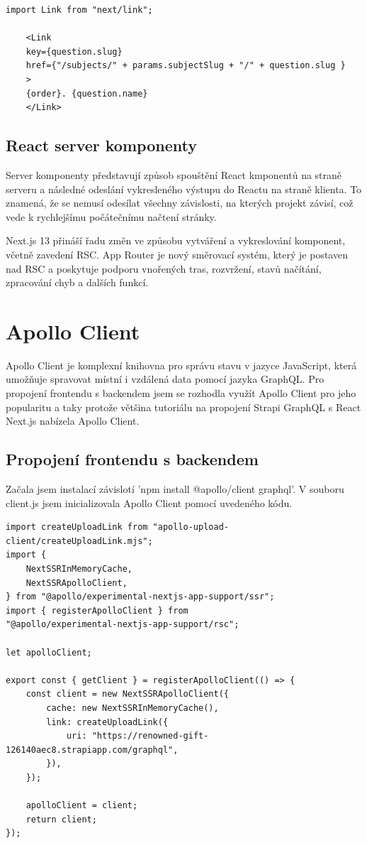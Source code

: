 \documentclass[12pt, a4paper,
oneside,      %
openright
]{report}
\begin{document}
\vspace{10pt}

\begin{lstlisting}[style=JavaScript, title={Kód}, caption={Ukázka next/link v layout.js}] 
	import Link from "next/link";
	
	<Link
	key={question.slug}
	href={"/subjects/" + params.subjectSlug + "/" + question.slug }
	>
	{order}. {question.name}
	</Link>
\end{lstlisting}	

\subsection{React server komponenty}
Server komponenty představují způsob spouštění React kmponentů na straně serveru a následné odeslání vykresleného výstupu do Reactu na straně klienta. To znamená, že se nemusí odesílat všechny závislosti, na kterých projekt závisí, což vede k rychlejšímu počátečnímu načtení stránky.

Next.js 13 přináší řadu změn ve způsobu vytváření a vykreslování komponent, včetně zavedení RSC. App Router je nový směrovací systém, který je postaven nad RSC a poskytuje podporu vnořených tras, rozvržení, stavů načítání, zpracování chyb a dalších funkcí.

\section{Apollo Client}
Apollo Client je komplexní knihovna pro správu stavu v jazyce JavaScript, která umožňuje spravovat místní i vzdálená data pomocí jazyka GraphQL. Pro propojení frontendu s backendem jsem se rozhodla využít Apollo Client pro jeho popularitu a taky protože většina tutoriálu na propojení Strapi GraphQL s React Next.js nabízela Apollo Client.

\subsection{Propojení frontendu s backendem}
Začala jsem instalací závislotí 'npm install @apollo/client graphql'. V souboru client.js jsem inicializovala Apollo Client pomocí uvedeného kódu.

\vspace{10pt}

\begin{lstlisting}[style=JavaScript, title={Kód}, caption={Ukázka inicializace Apollo Clientu v client.js}] 
import createUploadLink from "apollo-upload-client/createUploadLink.mjs";
import {
	NextSSRInMemoryCache,
	NextSSRApolloClient,
} from "@apollo/experimental-nextjs-app-support/ssr";
import { registerApolloClient } from
"@apollo/experimental-nextjs-app-support/rsc";

let apolloClient;

export const { getClient } = registerApolloClient(() => {
	const client = new NextSSRApolloClient({
		cache: new NextSSRInMemoryCache(),
		link: createUploadLink({
			uri: "https://renowned-gift-126140aec8.strapiapp.com/graphql",
		}),
	});
	
	apolloClient = client;
	return client;
});

\end{lstlisting}
\end{document}
